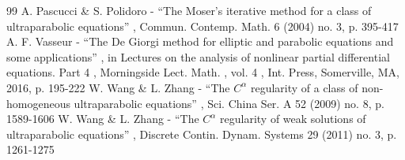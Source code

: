 \documentclass[11pt]{article}
\numberwithin{equation}{section}\let\oldbigcup\bigcup
\theoremstyle{definition}
\theoremstyle{remark}
\begin{document}
\begin{thebibliography}{99}
 A. Pascucci \& S. Polidoro - “The Moser’s iterative method for a class of ultraparabolic equations” , Commun. Contemp. Math. 6 (2004) no. 3, p. 395-417
 A. F. Vasseur - “The De Giorgi method for elliptic and parabolic equations and some applications” , in Lectures on the analysis of nonlinear partial differential equations. Part 4 , Morningside Lect. Math. , vol. 4 , Int. Press, Somerville, MA, 2016, p. 195-222
 W. Wang \& L. Zhang - “The $C^\alpha $ regularity of a class of non-homogeneous ultraparabolic equations” , Sci. China Ser. A 52 (2009) no. 8, p. 1589-1606
 W. Wang \& L. Zhang - “The $C^\alpha $ regularity of weak solutions of ultraparabolic equations” , Discrete Contin. Dynam. Systems 29 (2011) no. 3, p. 1261-1275
\end{thebibliography}
\end{document}
